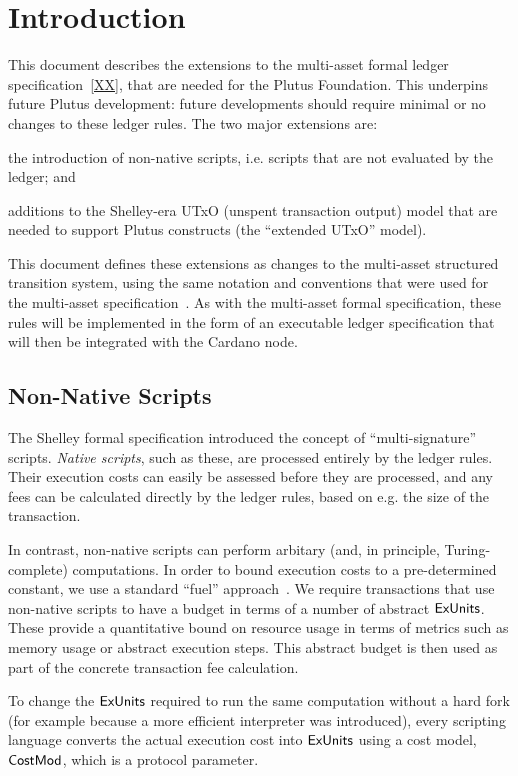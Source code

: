 \section{Introduction}

This document describes the extensions to the multi-asset formal ledger specification~\ref{XX},
that are needed for the Plutus Foundation.  This underpins future Plutus development: future developments should require minimal or no changes to these ledger rules.
%
The two major extensions are:
\begin{inparaenum}
\item
the introduction
of non-native scripts, i.e. scripts that are not evaluated by the ledger; and
\item
  additions to the Shelley-era UTxO (unspent transaction output) model that are needed to support Plutus
  constructs (the ``extended UTxO'' model).
\end{inparaenum}
This document defines these extensions as changes to the multi-asset structured transition system,
using the same notation and conventions that were used for the multi-asset specification~\cite{XX}.
As with the multi-asset formal specification, these rules will be implemented in the form of an executable ledger specification that will then be
integrated with the Cardano node.

\subsection{Non-Native Scripts}

The Shelley formal specification introduced the concept of ``multi-signature'' scripts.
\emph{Native scripts}, such as these, are processed entirely by the ledger rules.
Their execution costs can easily be assessed before they are processed,
and any fees can be calculated directly by the ledger rules, based on e.g. the
size of the transaction.

In contrast, non-native scripts can perform arbitary
(and, in principle, Turing-complete) computations.
In order to bound execution costs to a pre-determined constant, we use a standard ``fuel'' approach~\cite{XX}.
We require transactions that use non-native scripts
to have a budget in terms of a number of abstract $\mathsf{ExUnits}$.
These provide a quantitative bound on resource usage in terms of metrics such as memory usage or abstract execution steps.
This abstract budget is then used as part of the concrete transaction fee calculation.

To change the $\mathsf{ExUnits}$ required to
run the same computation without a hard fork (for example because a
more efficient interpreter was introduced), every scripting language
converts the actual execution cost into $\mathsf{ExUnits}$ using a cost model,
$\mathsf{CostMod}$, which is a protocol parameter.

